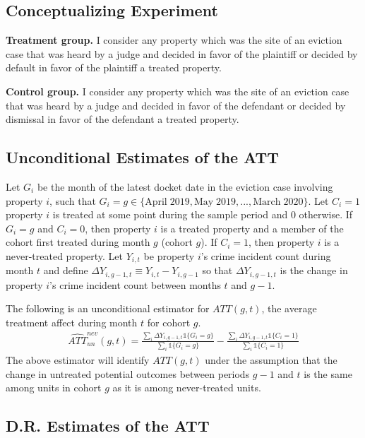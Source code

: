 \documentclass[12pt]{article}
\begin{document}
    \subsection{Conceptualizing Experiment}
    \textbf{Treatment group.} I consider any property which was the site of an eviction case that was heard by a judge and decided in favor of the plaintiff or decided by default in favor of the plaintiff a treated property.
    
    \textbf{Control group.} I consider any property which was the site of an eviction case that was heard by a judge and decided in favor of the defendant or decided by dismissal in favor of the defendant a treated property.
    
    
    
       \subsection{Unconditional Estimates of the ATT}
    
    Let $G_i$ be the month of the latest docket date in the eviction case involving property $i$, such that $G_i = g \in \{\text{April} \; 2019, \text{May} \; 2019, ..., \text{March} \; 2020\}$. Let $C_i = 1$ property $i$ is treated at some point during the sample period and $0$ otherwise. If $G_i = g$ and $C_i = 0$, then property $i$ is a treated property and a member of the cohort first treated during month $g$ (cohort $g$). If $C_i=1$, then property $i$ is a never-treated property. Let $Y_{i,t}$ be property $i$'s crime incident count during month $t$ and define $\Delta Y_{i, g-1, t} \equiv Y_{i,t} - Y_{i,g-1}$ so that $\Delta Y_{i, g-1, t}$ is the change in property $i$'s crime incident count between months $t$ and $g-1$.

 
    The following is an unconditional estimator for $ATT(g,t)$, the average treatment affect during month $t$ for cohort $g$.
    \begin{align}
        \hat{ATT}^{nev}_{un}(g, t) = \frac{\sum_i\Delta Y_{i, g-1, t}\mathds{1}\{G_i=g\}}{\sum_i\mathds{1}\{G_i=g\}} - \frac{\sum_i\Delta Y_{i, g-1, t}\mathds{1}\{C_i=1\}}{\sum_i\mathds{1}\{C_i=1\}}
    \end{align}
    The above estimator will identify $ATT(g,t)$ under the assumption that the change in untreated potential outcomes between periods $g-1$ and $t$ is the same among units in cohort $g$ as it is among never-treated units.

    \subsection{D.R. Estimates of the ATT}
\end{document}

